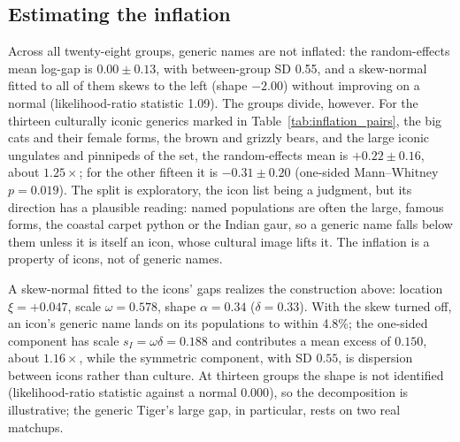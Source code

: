 \documentclass[11pt]{article}
\begin{document}
\subsection{Estimating the inflation}
Across all twenty-eight groups, generic names are not inflated: the random-effects mean log-gap is $0.00\pm0.13$, with between-group SD 0.55, and a skew-normal fitted to all of them skews to the left (shape $-2.00$) without improving on a normal (likelihood-ratio statistic 1.09). The groups divide, however. For the thirteen culturally iconic generics marked in Table~\ref{tab:inflation_pairs}, the big cats and their female forms, the brown and grizzly bears, and the large iconic ungulates and pinnipeds of the set, the random-effects mean is $+0.22\pm0.16$, about $1.25\times$; for the other fifteen it is $-0.31\pm0.20$ (one-sided Mann--Whitney $p=0.019$). The split is exploratory, the icon list being a judgment, but its direction has a plausible reading: named populations are often the large, famous forms, the coastal carpet python or the Indian gaur, so a generic name falls below them unless it is itself an icon, whose cultural image lifts it. The inflation is a property of icons, not of generic names.

A skew-normal fitted to the icons' gaps realizes the construction above: location $\xi=+0.047$, scale $\omega=0.578$, shape $\alpha=0.34$ ($\delta=0.33$). With the skew turned off, an icon's generic name lands on its populations to within 4.8\%; the one-sided component has scale $s_I=\omega\delta=0.188$ and contributes a mean excess of $0.150$, about $1.16\times$, while the symmetric component, with SD $0.55$, is dispersion between icons rather than culture. At thirteen groups the shape is not identified (likelihood-ratio statistic against a normal $0.000$), so the decomposition is illustrative; the generic Tiger's large gap, in particular, rests on two real matchups.
\end{document}
